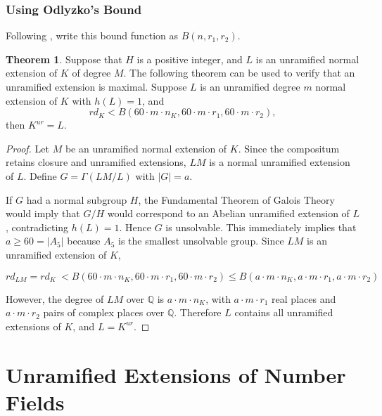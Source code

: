 \documentclass[12pt]{extarticle}
\newcommand{\Q}{\mathbb{Q}}
\newcommand{\<}{\langle}
\renewcommand{\>}{\rangle}
\theoremstyle{definition}
\newtheorem{theorem}{Theorem}
\begin{document}
\subsubsection*{Using Odlyzko's Bound}
Following \cite{YAMA1986}, write this bound function as $B(n,r_1,r_2)$.
\begin{theorem}
Suppose that $H$ is a positive integer, and $L$ is an unramified normal extension of $K$ of degree $M$. The following theorem can be used to verify that an unramified extension is maximal. Suppose $L$ is an unramified degree $m$ normal extension of $K$ with $h(L)=1$, and 
\begin{equation}
        rd_K<B(60 \cdot m \cdot n_K,60 \cdot m \cdot r_1,60 \cdot m \cdot r_2),
    \end{equation}
    then $K^{ur}=L$.
\end{theorem}
\begin{proof}
Let $M$ be an unramified normal extension of $K$. Since the compositum retains closure and unramified extensions, $LM$ is a normal unramified extension of $L$. Define $G=\Gamma(LM/L)$ with $|G|=a$. \par 
If $G$ had a normal subgroup $H$, the Fundamental Theorem of Galois Theory would imply that $G/H$ would correspond to an Abelian unramified extension of $L$, contradicting $h(L)=1$. Hence $G$ is unsolvable. This immediately implies that $a\geqslant 60 = |A_5|$ because $A_5$ is the smallest unsolvable group. Since $LM$ is an unramified extension of $K$, 

\begin{equation}
    rd_{LM}=rd_{K}\ < B(60 \cdot m \cdot n_K,60 \cdot m \cdot r_1,60 \cdot m \cdot r_2)\leq B(a \cdot m \cdot n_K,a \cdot m \cdot r_1,a \cdot m \cdot r_2)
\end{equation} 

However, the degree of $LM$ over $\Q$ is $a \cdot m \cdot n_K$, with $a \cdot m \cdot r_1$ real places and $a \cdot m \cdot r_2$ pairs of complex places over $\Q$. Therefore $L$ contains all unramified extensions of $K$, and $L=K^{ur}$.
\end{proof}



\section{Unramified Extensions of Number Fields}
\end{document}
